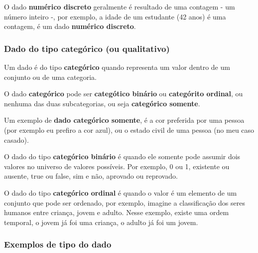 \documentclass[
]{book}
\begin{document}
O dado \textbf{numérico discreto} geralmente é resultado de uma contagem - um número inteiro -, por exemplo, a idade de um estudante (42 anos) é uma contagem, é um dado \textbf{numérico discreto}.

\hypertarget{dado-do-tipo-categuxf3rico-ou-qualitativo}{%
\subsubsection{Dado do tipo categórico (ou qualitativo)}\label{dado-do-tipo-categuxf3rico-ou-qualitativo}}

Um dado é do tipo \textbf{categórico} quando representa um valor dentro de um conjunto ou de uma categoria.

O dado \textbf{categórico} pode ser \textbf{categótico binário} ou \textbf{categórito ordinal}, ou nenhuma das duas subcategorias, ou seja \textbf{categórico somente}.

Um exemplo de \textbf{dado categórico somente}, é a cor preferida por uma pessoa (por exemplo eu prefiro a cor azul), ou o estado civil de uma pessoa (no meu caso casado).

O dado do tipo \textbf{categórico binário} é quando ele somente pode assumir dois valores no universo de valores possíveis. Por exemplo, 0 ou 1, existente ou ausente, true ou false, sim e não, aprovado ou reprovado.

O dado do tipo \textbf{categórico ordinal} é quando o valor é um elemento de um conjunto que pode ser ordenado, por exemplo, imagine a classificação dos seres humanos entre criança, jovem e adulto. Nesse exemplo, existe uma ordem temporal, o jovem já foi uma criança, o adulto já foi um jovem.

\hypertarget{exemplos-de-tipo-do-dado}{%
\subsubsection{Exemplos de tipo do dado}\label{exemplos-de-tipo-do-dado}}
\end{document}

